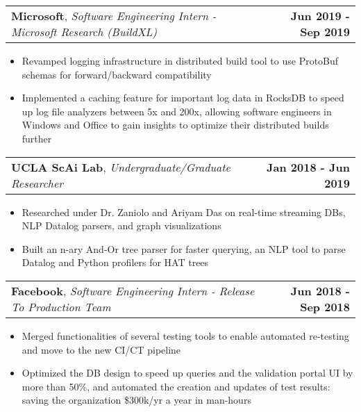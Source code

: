 \documentclass[letterpaper,10.8pt]{article}
\makeatletter
\newcommand{\resumeItemOne}[1]{
  \item[$\circ$]\small{{#1 \vspace{-2pt}}
  }
}
\newcommand{\resumeSubheading}[3]{
  \vspace{-2pt}\item[$ $]
    \begin{tabular*}{0.97\textwidth}{l@{\extracolsep{\fill}}r}
      \textbf{#1}, \textit{\small #2} & \textbf{\small #3} \\
    \end{tabular*}
  \vspace{-7pt}
}
\newcommand{\resumeItemListStart}{\begin{itemize}}
\newcommand{\resumeItemListEnd}{\end{itemize}\vspace{-5pt}}
\makeatother
\begin{document}
    \resumeSubheading{Microsoft}{Software Engineering Intern - Microsoft Research (BuildXL)}{Jun 2019 - Sep 2019}
    \resumeItemListStart
        \resumeItemOne{Revamped logging infrastructure in distributed build tool to use ProtoBuf schemas for forward/backward compatibility}
        \resumeItemOne{Implemented a caching feature for important log data in RocksDB to speed up log file analyzers between 5x and 200x, allowing software engineers in Windows and Office to gain insights to optimize their distributed builds further}
    \resumeItemListEnd
    
    \resumeSubheading{UCLA ScAi Lab}{Undergraduate/Graduate Researcher}{Jan 2018 - Jun 2019}
    \resumeItemListStart
        \resumeItemOne{Researched under Dr. Zaniolo and Ariyam Das on real-time streaming DBs, NLP Datalog parsers, and
        graph visualizations}
        \resumeItemOne{Built an n-ary And-Or tree parser for faster querying, an NLP tool to parse Datalog and Python profilers for HAT trees}
    \resumeItemListEnd

    \resumeSubheading{Facebook}{Software Engineering Intern - Release To Production Team}{Jun 2018 - Sep 2018}
    \resumeItemListStart
        \resumeItemOne{Merged functionalities of several testing tools to enable automated re-testing and move to the new CI/CT pipeline}
        \resumeItemOne{Optimized the DB design to speed up queries and the validation portal UI by more than 50\%, and automated the creation and updates of test results: saving the organization \$300k/yr a year in man-hours}
    \resumeItemListEnd
  
    
    
\end{document}
